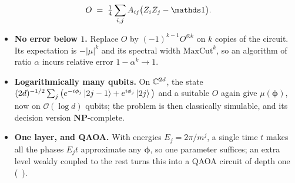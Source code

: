 \documentclass[handoutsbeamer.tex]{subfiles}
\begin{document}
\begin{frame}
\begin{equation}
    O \;=\; \tfrac14\sum_{i,j}A_{ij}\big(Z_iZ_j - \one\big).
\end{equation}
\begin{itemize}\setlength\itemsep{0.25em}
    \item \textbf{No error below $1$.} Replace $O$ by $(-1)^{k-1}O^{\otimes k}$ on $k$ copies of the circuit. Its expectation is $-|\mu|^k$ and its spectral width $\mathrm{MaxCut}^k$, so an algorithm of ratio $\alpha$ incurs relative error $1-\alpha^k \to 1$.
    \item \textbf{Logarithmically many qubits.} On $\mathbb{C}^{2d}$, the state $(2d)^{-1/2}\sum_j\big(e^{-i\phi_j}\ket{2j-1} + e^{i\phi_j}\ket{2j}\big)$ and a suitable $O$ again give $\mu(\boldsymbol\phi)$, now on $\mathcal O(\log d)$ qubits; the problem is then classically simulable, and its decision version $\mathbf{NP}$-complete.
    \item \textbf{One layer, and QAOA.} With energies $E_j = 2\pi/m^j$, a single time $t$ makes all the phases $E_jt$ approximate any $\boldsymbol\phi$, so one parameter suffices; an extra level weakly coupled to the rest turns this into a QAOA circuit of depth one (\Chap~).
\end{itemize}
\end{frame}
\end{document}
